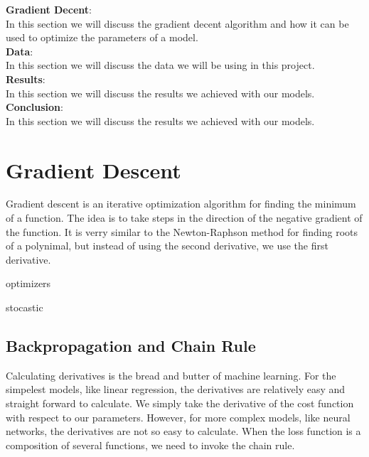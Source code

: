 \documentclass[twoside,11pt]{report}
\begin{document}
    \noindent
    \textbf{Gradient Decent}:\\ 
    In this section we will discuss the gradient decent algorithm and how it can be used to
    optimize the parameters of a model.\\
    \textbf{Data}: \\
    In this section we will discuss the data we will be using in this project.\\
    \textbf{Results}:\\
    In this section we will discuss the results we achieved with our models.\\
    \textbf{Conclusion}:\\
    In this section we will discuss the results we achieved with our models.\\



\section{Gradient Descent}
\label{sec:GD}

    Gradient descent is an iterative optimization algorithm for finding the minimum of a function.
    The idea is to take steps in the direction of the negative gradient of the function. It is
    verry similar to the Newton-Raphson method for finding roots of a polynimal,
    but instead of using the second derivative, we use the first derivative.

    optimizers

    stocastic





\subsection{Backpropagation and Chain Rule}
\label{sec:backpropagation}

    Calculating derivatives is the bread and butter of machine learning. For the simpelest models, like linear regression,
    the derivatives are relatively easy and straight forward to calculate. We simply take the derivative of the cost function
    with respect to our parameters. However, for more complex models, like neural networks, the derivatives 
    are not so easy to calculate.
    When the loss function is a composition of several functions, we need to invoke the chain rule. 
\end{document}
